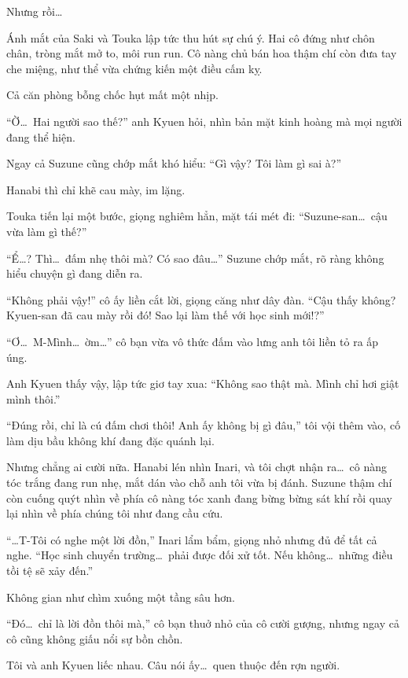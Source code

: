 \documentclass[../main.tex]{subfiles}
\begin{document}
Nhưng rồi\dots


Ánh mắt của Saki và Touka lập tức thu hút sự chú ý. Hai cô đứng như chôn chân, tròng mắt mở to, môi run run. Cô nàng chủ bán hoa thậm chí còn đưa tay che miệng, như thể vừa chứng kiến một điều cấm kỵ.

Cả căn phòng bỗng chốc hụt mất một nhịp.

``Ờ\dots\ Hai người sao thế?'' anh Kyuen hỏi, nhìn bản mặt kinh hoàng mà mọi người đang thể hiện.

Ngay cả Suzune cũng chớp mắt khó hiểu: ``Gì vậy? Tôi làm gì sai à?''

Hanabi thì chỉ khẽ cau mày, im lặng.

Touka tiến lại một bước, giọng nghiêm hẳn, mặt tái mét đi: ``Suzune-san\dots\ cậu vừa làm gì thế?''

``Ể\dots? Thì\dots\ đấm nhẹ thôi mà? Có sao đâu\dots'' Suzune chớp mắt, rõ ràng không hiểu chuyện gì đang diễn ra.

``Không phải vậy!'' cô ấy liền cắt lời, giọng căng như dây đàn. ``Cậu thấy không? Kyuen-san đã cau mày rồi đó! Sao lại làm thế với học sinh mới!?''

``Ơ\dots\ M-Mình\dots\ ờm\dots'' cô bạn vừa vô thức đấm vào lưng anh tôi liền tỏ ra ấp úng.

Anh Kyuen thấy vậy, lập tức giơ tay xua: ``Không sao thật mà. Mình chỉ hơi giật mình thôi.''

``Đúng rồi, chỉ là cú đấm chơi thôi! Anh ấy không bị gì đâu,'' tôi vội thêm vào, cố làm dịu bầu không khí đang đặc quánh lại.

Nhưng chẳng ai cười nữa. Hanabi lén nhìn Inari, và tôi chợt nhận ra\dots\ cô nàng tóc trắng đang run nhẹ, mắt dán vào chỗ anh tôi vừa bị đánh. Suzune thậm chí còn cuống quýt nhìn về phía cô nàng tóc xanh đang bừng bừng sát khí rồi quay lại nhìn về phía chúng tôi như đang cầu cứu.

``\dots T-Tôi có nghe một lời đồn,'' Inari lẩm bẩm, giọng nhỏ nhưng đủ để tất cả nghe. ``Học sinh chuyển trường\dots\ phải được đối xử tốt. Nếu không\dots\ những điều tồi tệ sẽ xảy đến.''


Không gian như chìm xuống một tầng sâu hơn.

``Đó\dots\ chỉ là lời đồn thôi mà,'' cô bạn thuở nhỏ của cô cười gượng, nhưng ngay cả cô cũng không giấu nổi sự bồn chồn.

Tôi và anh Kyuen liếc nhau. Câu nói ấy\dots\ quen thuộc đến rợn người.
\end{document}

